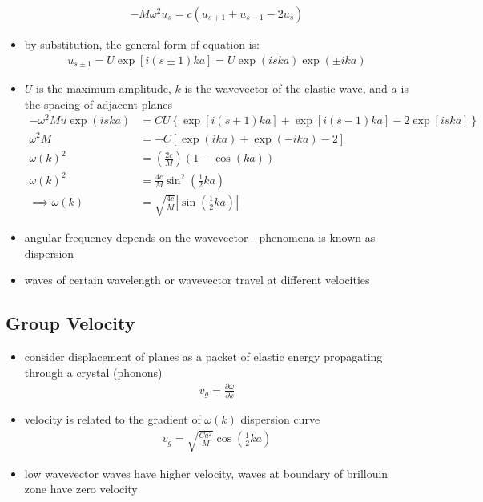\documentclass[a4paper,11pt,normalem]{article}
\begin{document}
\begin{itemize}
\begin{align*}
            -M\omega^2 u_s = c(u_{s+1}+u_{s-1}-2u_s)
        \end{align*}
    \item by substitution, the general form of equation is:
        \begin{align*}
            u_{s\pm1} = U\exp\left[i(s\pm1)ka\right] = U\exp\left(iska\right)\exp\left(\pm ika\right)
        \end{align*}
    \item \(U\) is the maximum amplitude, \(k\) is the wavevector of the elastic wave, and \(a\) is the spacing of adjacent planes
        \begin{align*}
            -\omega^2Mu\exp\left(iska\right) &= CU\left\{\exp\left[i(s+1)ka\right]+\exp\left[i(s-1)ka\right]-2\exp\left[iska\right]\right\} \\
            \omega^2M &= -C\left[\exp(ika) + \exp(-ika)-2\right] \\
            \omega(k)^2 &= \left(\frac{2c}{M}\right)(1 - \cos(ka)) \\
            \omega(k)^2 &= \frac{4c}{M}\sin^2\left(\frac{1}{2}ka\right) \\
            \implies \omega(k) &= \sqrt{\frac{4c}{M}}\left|\sin\left(\frac{1}{2}ka\right)\right|
        \end{align*}
    \item angular frequency depends on the wavevector - phenomena is known as dispersion
    \item waves of certain wavelength or wavevector travel at different velocities
\end{itemize}

\subsection{Group Velocity}

\begin{itemize}
    \item consider displacement of planes as a packet of elastic energy propagating through a crystal (phonons)
        \begin{align*}
            v_g = \frac{\partial \omega}{\partial k}
        \end{align*}
    \item velocity is related to the gradient of \(\omega(k)\) dispersion curve
        \begin{align*}
            v_g = \sqrt{\frac{Ca^2}{M}}\cos\left(\frac{1}{2}ka\right)
        \end{align*}
    \item low wavevector waves have higher velocity, waves at boundary of brillouin zone have zero velocity
\end{itemize}
\end{document}
